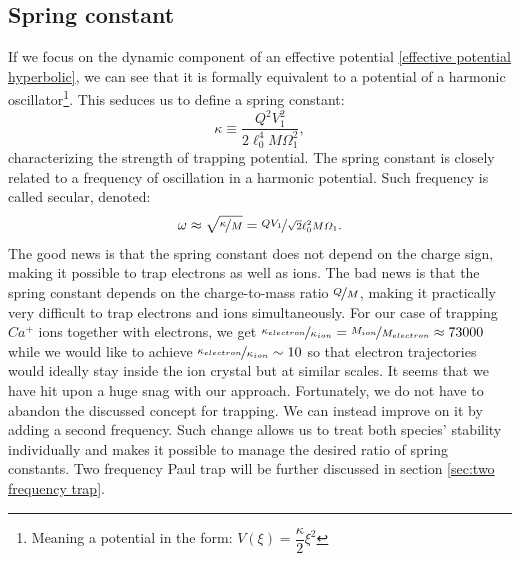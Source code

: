 \subsection{Spring constant}
\label{sec:spring constant}
If we focus on the dynamic component of an effective potential \eqref{effective potential hyperbolic}, we can see that it is formally equivalent to a potential of a harmonic oscillator\footnote{Meaning a potential in the form: $V(\xi) = \dfrac{\kappa}{2} \xi^2$}. This seduces us to define a spring constant: 
\begin{equation}
	\label{spring constant}
	\kappa \equiv \dfrac{Q^2 V_1^2}{2\ell_0^4 M \Omega_1^2},
\end{equation}
characterizing the strength of trapping potential. The spring constant is closely related to a frequency of oscillation in a harmonic potential. Such frequency is called secular, denoted: 
\begin{equation}
	\label{secular frequency}
	\omega \approx \sqrt{\nicefrac{\kappa}{M}} = \nicefrac{Q V_1}{\sqrt{2}\ell_0^2 M \Omega_1}.
\end{equation}
The good news is that the spring constant does not depend on the charge sign, making it possible to trap electrons as well as ions. The bad news is that the spring constant depends on the charge-to-mass ratio $\nicefrac{Q}{M}$, making it practically very difficult to trap electrons and ions simultaneously. For our case of trapping $Ca^+$ ions together with electrons, we get $\nicefrac{\kappa_{electron}}{\kappa_{ion}} = \nicefrac{M_{ion}}{M_{electron}} \approx 73000$ while we would like to achieve $\nicefrac{\kappa_{electron}}{\kappa_{ion}} \sim 10$ so that electron trajectories would ideally stay inside the ion crystal but at similar scales. It seems that we have hit upon a huge snag with our approach. Fortunately, we do not have to abandon the discussed concept for trapping. We can instead improve on it by adding a second frequency. Such change allows us to treat both species' stability individually and makes it possible to manage the desired ratio of spring constants. Two frequency Paul trap will be further discussed in section \ref{sec:two frequency trap}.

